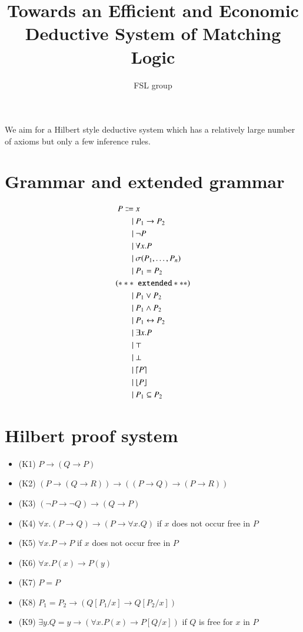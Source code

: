 \documentclass{article}
\title{Towards an Efficient and Economic Deductive System of Matching Logic}
\author{FSL group}
\DeclarePairedDelimiter\ceil{\lceil}{\rceil}
\DeclarePairedDelimiter\floor{\lfloor}{\rfloor}
\begin{document}
\maketitle
We aim for a Hilbert style deductive system which has a relatively large number of axioms but only a few inference rules. 

\section{Grammar and extended grammar}

\begin{align*}
P \Coloneqq\  & x \\
       \mid\  & P_1 \to P_2 \\
       \mid\  & \neg P \\
       \mid\  & \forall x . P \\
       \mid\  & \sigma(P_1,\dots,P_n) \\
       \mid\  & P_1 = P_2 \\
 {\tt (*** }\ & \ {\tt  extended  ***)} \\
       \mid\  & P_1 \vee P_2 \\
       \mid\  & P_1 \wedge P_2 \\
       \mid\  & P_1 \leftrightarrow P_2 \\
       \mid\  & \exists x . P \\
       \mid\  & \top \\
       \mid\  & \bot \\
       \mid\  & \ceil*{P} \\
       \mid\  & \floor*{P} \\
       \mid\  & P_1 \subseteq P_2 
\end{align*}


\section{Hilbert proof system}

\begin{itemize}
\item (K1) $P \to (Q \to P)$
\item (K2) $(P \to (Q \to R)) \to ((P \to Q) \to (P \to R))$
\item (K3) $(\neg P \to \neg Q) \to (Q \to P)$
\item (K4) $\forall x . (P \to Q) \to (P \to \forall x . Q)$ if $x$ does not occur free in $P$
\item (K5) $\forall x . P \to P$ if $x$ does not occur free in $P$
\item (K6) $\forall x . P(x) \to P(y)$
\item (K7) $P = P$
\item (K8) $P_1 = P_2 \to (Q[P_1/x] \to Q[P_2/x])$
\item (K9) $\exists y . Q = y \to (\forall x . P(x) \to P[Q/x])$ if $Q$ is free for $x$ in $P$
\end{itemize}
\end{document}
